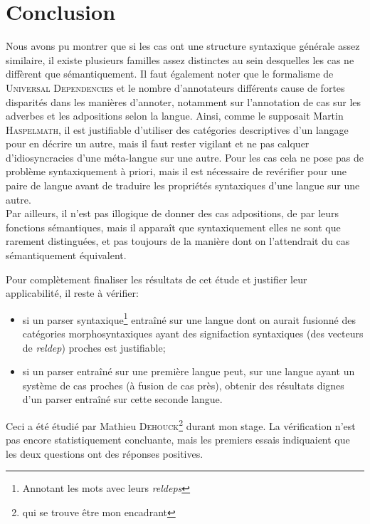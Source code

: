 \documentclass{cours}
\begin{document}
\section{Conclusion}
Nous avons pu montrer que si les cas ont une structure syntaxique générale assez similaire, il existe plusieurs familles assez distinctes au sein desquelles les cas ne diffèrent que sémantiquement.
Il faut également noter que le formalisme de \textsc{Universal Dependencies} et le nombre d'annotateurs différents cause de fortes disparités dans les manières d'annoter, notamment sur l'annotation de cas sur les adverbes et les adpositions selon la langue.
Ainsi, comme le supposait Martin \textsc{Haspelmath}, il est justifiable d'utiliser des catégories descriptives d'un langage pour en décrire un autre, mais il faut rester vigilant et ne pas calquer d'idiosyncracies d'une méta-langue sur une autre.
Pour les cas cela ne pose pas de problème syntaxiquement à priori, mais il est nécessaire de revérifier pour une paire de langue avant de traduire les propriétés syntaxiques d'une langue sur une autre.
\\
Par ailleurs, il n'est pas illogique de donner des cas adpositions, de par leurs fonctions sémantiques, mais il apparaît que syntaxiquement elles ne sont que rarement distinguées, et pas toujours de la manière dont on l'attendrait du cas sémantiquement équivalent.

\medskip

Pour complètement finaliser les résultats de cet étude et justifier leur applicabilité, il reste à vérifier:
\begin{itemize}
		\item si un parser syntaxique\footnote{Annotant les mots avec leurs \textit{reldeps}} entraîné sur une langue dont on aurait fusionné des catégories morphosyntaxiques ayant des signifaction syntaxiques (des vecteurs de \textit{reldep}) proches est justifiable;
		\item si un parser entraîné sur une première langue peut, sur une langue ayant un système de cas proches (à fusion de cas près), obtenir des résultats dignes d'un parser entraîné sur cette seconde langue.
	\end{itemize}

Ceci a été étudié par Mathieu \textsc{Dehouck}\footnote{qui se trouve être mon encadrant} durant mon stage.
La vérification n'est pas encore statistiquement concluante, mais les premiers essais indiquaient que les deux questions ont des réponses positives.


\appendix



\end{document}
